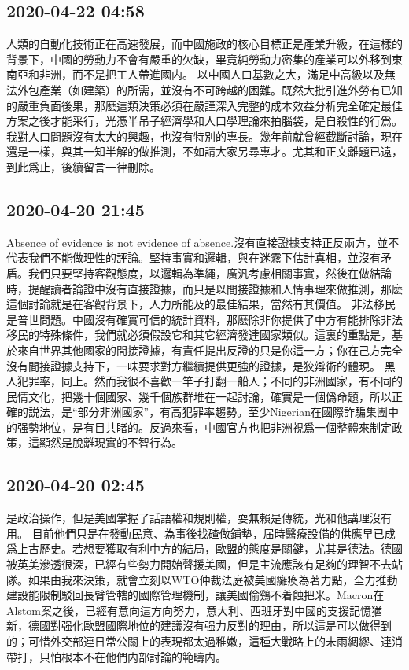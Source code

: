\documentclass[twocolumn]{ctexart}
\begin{document}
\subsection*{2020-04-22 04:58}

人類的自動化技術正在高速發展，而中國施政的核心目標正是產業升級，在這樣的背景下，中國的勞動力不會有嚴重的欠缺，畢竟純勞動力密集的產業可以外移到東南亞和非洲，而不是把工人帶進國内。
以中國人口基數之大，滿足中高級以及無法外包產業（如建築）的所需，並沒有不可跨越的困難。既然大批引進外勞有已知的嚴重負面後果，那麽這類決策必須在嚴謹深入完整的成本效益分析完全確定最佳方案之後才能采行，光憑半吊子經濟學和人口學理論來拍腦袋，是自殺性的行爲。
我對人口問題沒有太大的興趣，也沒有特別的專長。幾年前就曾經截斷討論，現在還是一樣，與其一知半解的做推測，不如請大家另尋專才。尤其和正文離題已遠，到此爲止，後續留言一律刪除。
\subsection*{2020-04-20 21:45}

Absence of evidence is not evidence of absence.沒有直接證據支持正反兩方，並不代表我們不能做理性的評論。堅持事實和邏輯，與在迷霧下估計真相，並沒有矛盾。我們只要堅持客觀態度，以邏輯為準繩，廣汎考慮相關事實，然後在做結論時，提醒讀者論證中沒有直接證據，而只是以間接證據和人情事理來做推測，那麽這個討論就是在客觀背景下，人力所能及的最佳結果，當然有其價值。
非法移民是普世問題。中國沒有確實可信的統計資料，那麽除非你提供了中方有能排除非法移民的特殊條件，我們就必須假設它和其它經濟發達國家類似。這裏的重點是，基於來自世界其他國家的間接證據，有責任提出反證的只是你這一方；你在己方完全沒有間接證據支持下，一味要求對方繼續提供更強的證據，是狡辯術的體現。
黑人犯罪率，同上。然而我很不喜歡一竿子打翻一船人；不同的非洲國家，有不同的民情文化，把幾十個國家、幾千個族群堆在一起討論，確實是一個僞命題，所以正確的説法，是“部分非洲國家”，有高犯罪率趨勢。至少Nigerian在國際詐騙集團中的强勢地位，是有目共睹的。反過來看，中國官方也把非洲視爲一個整體來制定政策，這顯然是脫離現實的不智行為。
\subsection*{2020-04-20 02:45}

是政治操作，但是美國掌握了話語權和規則權，耍無賴是傳統，光和他講理沒有用。
目前他們只是在發動民意、為事後找碴做鋪墊，届時醫療設備的供應早已成爲上古歷史。若想要獲取有利中方的結局，歐盟的態度是關鍵，尤其是德法。德國被英美滲透很深，已經有些勢力開始聲援美國，但是主流應該有足夠的理智不去站隊。如果由我來決策，就會立刻以WTO仲裁法庭被美國癱瘓為著力點，全力推動建設能限制駁回長臂管轄的國際管理機制，讓美國偷鷄不着蝕把米。Macron在Alstom案之後，已經有意向這方向努力，意大利、西班牙對中國的支援記憶猶新，德國對强化歐盟國際地位的建議沒有强力反對的理由，所以這是可以做得到的；可惜外交部連日常公關上的表現都太過稚嫩，這種大戰略上的未雨綢繆、連消帶打，只怕根本不在他們内部討論的範疇内。
\end{document}
